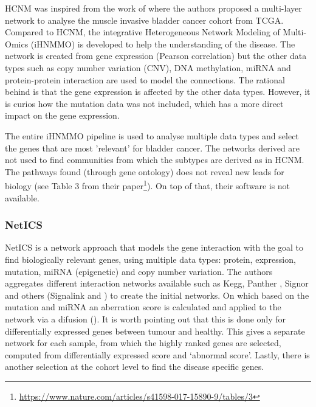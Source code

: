 HCNM was inspired from the work of \citet{Peng2017-ik} where the authors proposed a multi-layer network to analyse the muscle invasive bladder cancer cohort from TCGA. Compared to HCNM, the integrative Heterogeneous Network Modeling of Multi-Omics (iHNMMO) is developed to help the understanding of the disease. The network is created from gene expression (Pearson correlation) but the other data types such as copy number variation (CNV), DNA methylation, miRNA and protein-protein interaction are used to model the connections. The rational behind is that the gene expression is affected by the other data types. However, it is curios how the mutation data was not included, which has a more direct impact on the gene expression.

The entire iHNMMO pipeline is used to analyse multiple data types and select the genes that are most 'relevant' for bladder cancer. The networks derived are not used to find communities from which the subtypes are derived as in HCNM\cite{Vangimalla2021-fc, Care2019-ij}. The pathways found (through gene ontology) does not reveal new leads for biology (see Table 3 from their paper\footnote{\url{https://www.nature.com/articles/s41598-017-15890-9/tables/3}}). On top of that, their software is not available.

\subsubsection{NetICS}

NetICS is a network approach that models the gene interaction with the goal to find biologically relevant genes, using multiple data types: protein, expression, mutation, miRNA (epigenetic) and copy number variation. The authors aggregates different interaction networks available such as Kegg\cite{Kanehisa2017-wj}, Panther \cite{Thomas2022-kn}, Signor \cite{Perfetto2016-tw} and others (Signalink\cite{Fazekas2013-qh} and \citet{Wu2010-ap}) to create the initial networks. On which based on the mutation and miRNA an aberration score is calculated and applied to the network via a difusion (\cite{Leiserson2015-kv}). It is worth pointing out that this is done only for differentially expressed genes between tumour and healthy. This gives a separate network for each sample, from which the highly ranked genes are selected, computed from differentially expressed score and ‘abnormal score’. Lastly, there is another selection at the cohort level to find the disease specific genes.

